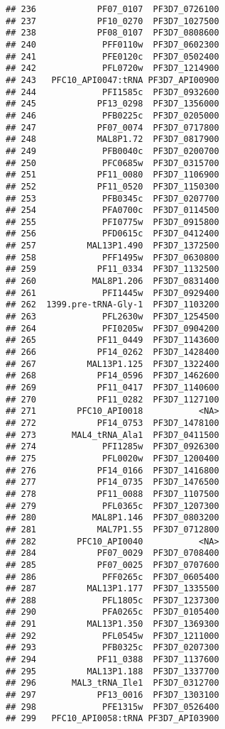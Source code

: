 \documentclass{article}\usepackage[]{graphicx}\usepackage[]{color}
\makeatletter
\newenvironment{kframe}{%
 \def\at@end@of@kframe{}%
 \ifinner\ifhmode%
  \def\at@end@of@kframe{\end{minipage}}%
  \begin{minipage}{\columnwidth}%
 \fi\fi%
 \def\FrameCommand##1{\hskip\@totalleftmargin \hskip-\fboxsep
 \colorbox{shadecolor}{##1}\hskip-\fboxsep
     \hskip-\linewidth \hskip-\@totalleftmargin \hskip\columnwidth}%
 \MakeFramed {\advance\hsize-\width
   \@totalleftmargin\z@ \linewidth\hsize
   \@setminipage}}%
 {\par\unskip\endMakeFramed%
 \at@end@of@kframe}
\newenvironment{knitrout}{}{} %
\makeatother
\begin{document}
\begin{knitrout}
\begin{kframe}
\begin{verbatim}
## 236            PF07_0107  PF3D7_0726100
## 237            PF10_0270  PF3D7_1027500
## 238            PF08_0107  PF3D7_0808600
## 240             PFF0110w  PF3D7_0602300
## 241             PFE0120c  PF3D7_0502400
## 242             PFL0720w  PF3D7_1214900
## 243   PFC10_API0047:tRNA PF3D7_API00900
## 244             PFI1585c  PF3D7_0932600
## 245            PF13_0298  PF3D7_1356000
## 246             PFB0225c  PF3D7_0205000
## 247            PF07_0074  PF3D7_0717800
## 248            MAL8P1.72  PF3D7_0817900
## 249             PFB0040c  PF3D7_0200700
## 250             PFC0685w  PF3D7_0315700
## 251            PF11_0080  PF3D7_1106900
## 252            PF11_0520  PF3D7_1150300
## 253             PFB0345c  PF3D7_0207700
## 254             PFA0700c  PF3D7_0114500
## 255             PFI0775w  PF3D7_0915800
## 256             PFD0615c  PF3D7_0412400
## 257          MAL13P1.490  PF3D7_1372500
## 258             PFF1495w  PF3D7_0630800
## 259            PF11_0334  PF3D7_1132500
## 260           MAL8P1.206  PF3D7_0831400
## 261             PFI1445w  PF3D7_0929400
## 262  1399.pre-tRNA-Gly-1  PF3D7_1103200
## 263             PFL2630w  PF3D7_1254500
## 264             PFI0205w  PF3D7_0904200
## 265            PF11_0449  PF3D7_1143600
## 266            PF14_0262  PF3D7_1428400
## 267          MAL13P1.125  PF3D7_1322400
## 268            PF14_0596  PF3D7_1462600
## 269            PF11_0417  PF3D7_1140600
## 270            PF11_0282  PF3D7_1127100
## 271        PFC10_API0018           <NA>
## 272            PF14_0753  PF3D7_1478100
## 273       MAL4_tRNA_Ala1  PF3D7_0411500
## 274             PFI1285w  PF3D7_0926300
## 275             PFL0020w  PF3D7_1200400
## 276            PF14_0166  PF3D7_1416800
## 277            PF14_0735  PF3D7_1476500
## 278            PF11_0088  PF3D7_1107500
## 279             PFL0365c  PF3D7_1207300
## 280           MAL8P1.146  PF3D7_0803200
## 281            MAL7P1.55  PF3D7_0712800
## 282        PFC10_API0040           <NA>
## 284            PF07_0029  PF3D7_0708400
## 285            PF07_0025  PF3D7_0707600
## 286             PFF0265c  PF3D7_0605400
## 287          MAL13P1.177  PF3D7_1335500
## 288             PFL1805c  PF3D7_1237300
## 290             PFA0265c  PF3D7_0105400
## 291          MAL13P1.350  PF3D7_1369300
## 292             PFL0545w  PF3D7_1211000
## 293             PFB0325c  PF3D7_0207300
## 294            PF11_0388  PF3D7_1137600
## 295          MAL13P1.188  PF3D7_1337700
## 296       MAL3_tRNA_Ile1  PF3D7_0312700
## 297            PF13_0016  PF3D7_1303100
## 298             PFE1315w  PF3D7_0526400
## 299   PFC10_API0058:tRNA PF3D7_API03900

\end{verbatim}
\end{kframe}
\end{knitrout}
\end{document}
